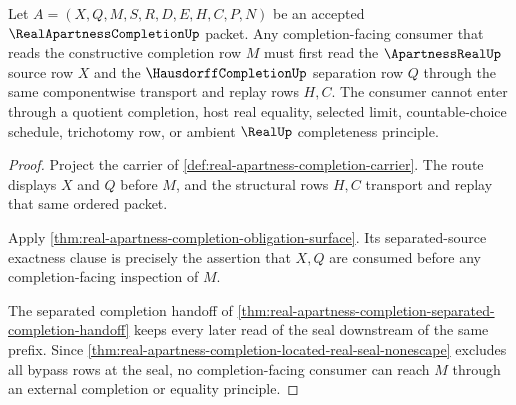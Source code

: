 \begin{theorem}
\label{thm:real-apartness-completion-separated-source-exactness}
Let $A=(X,Q,M,S,R,D,E,H,C,P,N)$ be an accepted $\RealApartnessCompletionUp$ packet. Any completion-facing consumer that reads the constructive completion row $M$ must first read the $\ApartnessRealUp$ source row $X$ and the $\HausdorffCompletionUp$ separation row $Q$ through the same componentwise transport and replay rows $H,C$. The consumer cannot enter through a quotient completion, host real equality, selected limit, countable-choice schedule, trichotomy row, or ambient $\RealUp$ completeness principle.
\end{theorem}
\begin{proof}
Project the carrier of \autoref{def:real-apartness-completion-carrier}. The route displays $X$ and $Q$ before $M$, and the structural rows $H,C$ transport and replay that same ordered packet.

Apply \autoref{thm:real-apartness-completion-obligation-surface}. Its separated-source exactness clause is precisely the assertion that $X,Q$ are consumed before any completion-facing inspection of $M$.

The separated completion handoff of \autoref{thm:real-apartness-completion-separated-completion-handoff} keeps every later read of the seal downstream of the same prefix. Since \autoref{thm:real-apartness-completion-located-real-seal-nonescape} excludes all bypass rows at the seal, no completion-facing consumer can reach $M$ through an external completion or equality principle.
\end{proof}

